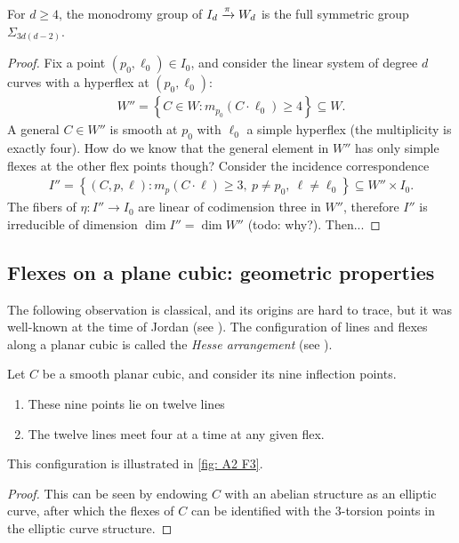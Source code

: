 \documentclass[11pt]{amsart}
\begin{document}
\begin{theorem} For $d\ge 4$, the monodromy group of $I_d \xrightarrow{\pi} W_d$ is the full symmetric group $\Sigma_{3d(d-2)}$.
\end{theorem}
\begin{proof} Fix a point $(p_0,\ell_0) \in I_0$, and consider the linear system of degree $d$ curves with a hyperflex at $(p_0,\ell_0)$:
\begin{align*}
    W'' = \left\{ C \in W \colon m_{p_0}(C\cdot \ell_0) \ge 4 \right\} \subseteq W.
\end{align*}
A general $C \in W''$ is smooth at $p_0$ with $\ell_0$ a simple hyperflex (the multiplicity is exactly four). How do we know that the general element in $W''$ has only simple flexes at the other flex points though? Consider the incidence correspondence
\begin{align*}
    I'' = \left\{ (C,p,\ell) \colon m_p(C\cdot \ell) \ge3,\ p\ne p_0,\ \ell\ne \ell_0 \right\} \subseteq W'' \times I_0.
\end{align*}
The fibers of $\eta \colon I'' \to I_0$ are linear of codimension three in $W''$, therefore $I''$ is irreducible of dimension $\dim I'' = \dim W''$ (todo: why?). Then...
\end{proof}

\subsection{Flexes on a plane cubic: geometric properties}

The following observation is classical, and its origins are hard to trace, but it was well-known at the time of Jordan (see \cite[p.~302]{Jordan}). The configuration of lines and flexes along a planar cubic is called the \textit{Hesse arrangement} (see \cite[p.~118]{Dolgachev}).

\begin{proposition} Let $C$ be a smooth planar cubic, and consider its nine inflection points.
\begin{enumerate}
    \item These nine points lie on twelve lines
    \item The twelve lines meet four at a time at any given flex.
\end{enumerate}
This configuration is illustrated in \autoref{fig: A2 F3}.
\end{proposition}
\begin{proof} This can be seen by endowing $C$ with an abelian structure as an elliptic curve, after which the flexes of $C$ can be identified with the $3$-torsion points in the elliptic curve structure.
\end{proof}
\end{document}
